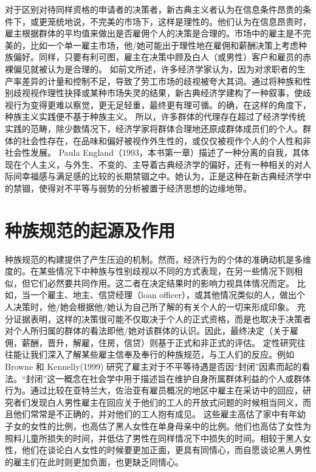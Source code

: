 \documentclass[UTF8]{ctexart}
\begin{document}
对于区别对待同样资格的申请者的决策者，新古典主义者认为在信息条件昂贵的条件下，或更笼统地说，不完美的市场下，这样是理性的。他们认为在信息昂贵时，雇主根据群体的平均值来做出是否雇佣个人的决策是合理的。市场中的雇主是不完美的，比如一个单一雇主市场，他/她可能出于理性地在雇佣和薪酬决策上考虑种族偏好。同样，只要有利可图，雇主在决策中顾及白人（或男性）客户和雇员的赤裸偏见就被认为是合理的。
如前文所述，许多经济学家认为，因为对求职者的生产率差异的计量和控制不足，导致了劳工市场的歧视被夸大其词。通过将种族和性别歧视视作理性抉择或某种市场失灵的结果，新古典经济学建构了一种叙事，使歧视行为变得更难以察觉，更无足轻重，最终更有理可循。的确，在这样的角度下，种族主义实践便不基于种族主义。
所以，许多群体的代理存在超过了经济学传统实践的范畴，除少数情况下，经济学家将群体合理地还原成群体成员们的个人。群体的社会性存在，在品味和偏好被视作外生性的，或仅仅被视作个人的个人性和非社会性发展。
Paula England（1993，本书第一章）描述了一种分离的自我，其体现在个人主义，与外生、不变的、主导着古典经济学的偏好，还有一种相关的对人际间幸福感与满足感的比较的长期禁锢之中。她认为，正是这种在新古典经济学中的禁锢，使得对不平等与弱势的分析被置于经济思想的边缘地带。

\section{种族规范的起源及作用} 种族规范的构建提供了产生压迫的机制。\cite{07}然而，经济行为的个体的准确动机是多维度的。在某些情况下中种族与性别歧视以不同的方式表现，在另一些情况下则相似，但它们必然要共同作用。这二者在决定结果时的影响力视具体情况而定。
比如，当一个雇主、地主、信贷经理（loan officer），或其他情况类似的人，做出个人决策时，他/她会根据他/她认为自己所了解的有关个人的一切来形成印象。 充分证据表明，这样的决策很可能不仅取决于个人的正式资格，而是也取决于决策者对个人所归属的群体的看法即他/她对该群体的认识。因此，最终决定（关于雇佣，薪酬，晋升，解雇，住房，信贷）则基于正式和非正式的评估。
定性研究往往能让我们深入了解某些雇主信奉及奉行的种族规范，与工人们的反应。例如 Browne 和 Kennelly(1999) 研究了雇主对于不平等待遇是否因“封闭”因素而起的看法。“封闭”这一概念在社会学中用于描述旨在维护自身所属群体利益的个人或群体行为。通过比较在亚特兰大，佐治亚有雇员概况的地区中雇主在采访中的回应，研究者们发现白人男性雇主在回应关于他们的工人的开放式问题的时候相当同义，而且他们常常是不正确的，并对他们的工人抱有成见。
这些雇主高估了家中有年幼子女的女性的比例，也高估了黑人女性在单身母亲中的比例。他们也高估了女性为照料儿童所损失的时间，并低估了男性在同样情况下中损失的时间。相较于黑人女性，他们在谈论白人女性的时候要更加正面，更具有同情心\cite{08}，而自愿谈论黑人男性的雇主们在此时则更加负面，也更缺乏同情心。
\end{document}
